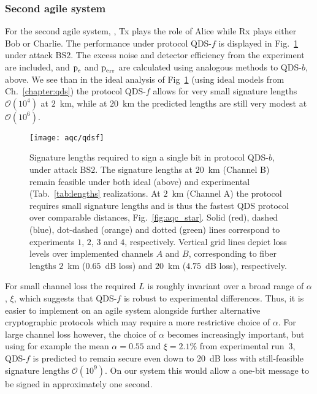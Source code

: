 \subsubsection{Second agile system \systemF}
For the second agile system, \systemF, Tx plays the role of Alice while Rx plays either Bob or Charlie. The performance under protocol QDS-$f$ is displayed in Fig.~\ref{fig:aqc_qdsf} under attack BS$2$. The excess noise and detector efficiency from the experiment are included, and $\text{p}_{\text{e}}$ and $\text{p}_{\text{err}}$ are calculated using analogous methods to QDS-$b$, above. We see than in the ideal analysis of Fig~\ref{fig:aqc_qdsf} (using ideal models from Ch.~\ref{chapter:qds}) the protocol QDS-$f$ allows for very small signature lengths $\mathcal{O}\left(10^4\right)$ at $2$~km, while at $20$~km the predicted lengths are still very modest at $\mathcal{O}\left(10^6\right)$.

\begin{figure}[htp]
\captionsetup{width=0.8\linewidth}
\centering
\texttt{[image: aqc/qdsf]}
\caption{\label{fig:aqc_qdsf} Signature lengths required to sign a single bit in protocol QDS-$b$, under attack BS$2$. The signature lengths at $20$~km (Channel B) remain feasible under both ideal (above) and experimental (Tab.~\ref{tab:lengths} realizations. At $2$~km (Channel A) the protocol requires small signature lengths and is thus the fastest QDS protocol over comparable distances, Fig.~\ref{fig:aqc_star}. Solid (red), dashed (blue), dot-dashed (orange) and dotted (green) lines correspond to experiments $1$, $2$, $3$ and $4$, respectively. Vertical grid lines depict loss levels over implemented channels $A$ and $B$, corresponding to fiber lengths $2$~km ($0.65$~dB loss) and $20$~km ($4.75$~dB loss), respectively.}
\end{figure}

For small channel loss the required $L$ is roughly invariant over a broad range of $\alpha$, $\xi$, which suggests that QDS-$f$ is robust to experimental differences. Thus, it is easier to implement on an agile system alongside further alternative cryptographic protocols which may require a more restrictive choice of $\alpha$. For large channel loss however, the choice of $\alpha$ becomes increasingly important, but using for example the mean $\alpha = 0.55$ and $\xi = 2.1\%$ from experimental run~$3$, QDS-$f$ is predicted to remain secure even down to $20$~dB loss with still-feasible signature lengths $\mathcal{O}\left(10^9\right)$. On our system this would allow a one-bit message to be signed in approximately one second.


